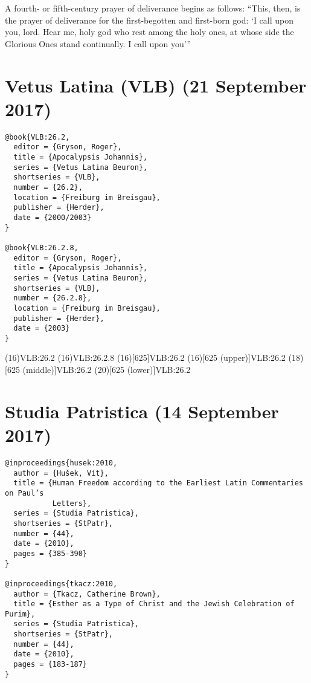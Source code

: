 \documentclass[a4paper]{article}
\begin{document}
\begin{verbcite}
  A fourth- or fifth-century prayer of deliverance begins as follows: “This,
  then, is the prayer of deliverance for the first-begotten and first-born
  god: ‘I call upon you, lord. Hear me, holy god who rest among the holy ones,
  at whose side the Glorious Ones stand continually. I call upon you’”
  \parencite[( \mkbibbrackets{O'Neil in Betz})]{PGM:betz}
\end{verbcite}
\nocite{preisendaz:1973-1974}
\exampleabbreviations
\examplebibliography
{}

\section{Vetus Latina (VLB) (21 September 2017)}

\begin{verbatim}
@book{VLB:26.2,
  editor = {Gryson, Roger},
  title = {Apocalypsis Johannis},
  series = {Vetus Latina Beuron},
  shortseries = {VLB},
  number = {26.2},
  location = {Freiburg im Breisgau},
  publisher = {Herder},
  date = {2000/2003}
}

@book{VLB:26.2.8,
  editor = {Gryson, Roger},
  title = {Apocalypsis Johannis},
  series = {Vetus Latina Beuron},
  shortseries = {VLB},
  number = {26.2.8},
  location = {Freiburg im Breisgau},
  publisher = {Herder},
  date = {2003}
}
\end{verbatim}

\examplecite(16){VLB:26.2}
\examplecite(16){VLB:26.2.8}
\citereset
\examplecite(16)[625]{VLB:26.2}
\citereset
\examplecite(16)[625 \mkbibparens{upper}]{VLB:26.2}
\examplecite(18)[625 \mkbibparens{middle}]{VLB:26.2}
\examplecite(20)[625 \mkbibparens{lower}]{VLB:26.2}
\exampleabbreviations
\examplebibliography
{}

\section{Studia Patristica (14 September 2017)}

\begin{verbatim}
@inproceedings{husek:2010,
  author = {Hušek, Vít},
  title = {Human Freedom according to the Earliest Latin Commentaries on Paul’s
           Letters},
  series = {Studia Patristica},
  shortseries = {StPatr},
  number = {44},
  date = {2010},
  pages = {385-390}
}

@inproceedings{tkacz:2010,
  author = {Tkacz, Catherine Brown},
  title = {Esther as a Type of Christ and the Jewish Celebration of Purim},
  series = {Studia Patristica},
  shortseries = {StPatr},
  number = {44},
  date = {2010},
  pages = {183-187}
}
\end{verbatim}
\end{document}
